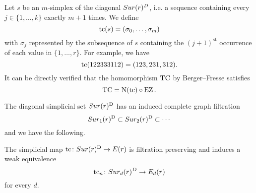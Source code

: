 %


Let $s$ be an $m$-simplex of the diagonal $Sur(r)^D$, i.e. a sequence containing every $j \in \{1,\dots,k\}$ exactly $m+1$ times.
We define
\[
\operatorname{tc}(s) = (\sigma_0,\dots,\sigma_m)
\]
with $\sigma_j$ represented by the subsequence of $s$ containing the $(j+1)^{\mathrm{st}}$ occurrence of each value in $\{1,\dots,r\}$.
For example, we have
\[
\operatorname{tc}(122333112) = (123,231,312).
\]
It can be directly verified that the homomorphism $\operatorname{TC}$ by Berger--Fresse satisfies
\[
\operatorname{TC} = \operatorname{N}(\operatorname{tc}) \circ \operatorname{EZ}.
\]

The diagonal simplicial set $Sur(r)^{\mathrm{D}}$ has an induced complete graph filtration
\[
Sur_1(r)^{\mathrm{D}} \subset Sur_2(r)^{\mathrm{D}} \subset \dotsb
\]
and we have the following.

\begin{theorem}
	The simplicial map $\operatorname{tc} \colon Sur(r)^{\mathrm{D}} \to E(r)$ is filtration preserving and induces a weak equivalence
	\[
	\operatorname{tc}_{n} \colon Sur_d(r)^{D} \to E_d(r)
	\]
	for every $d$.
\end{theorem}

